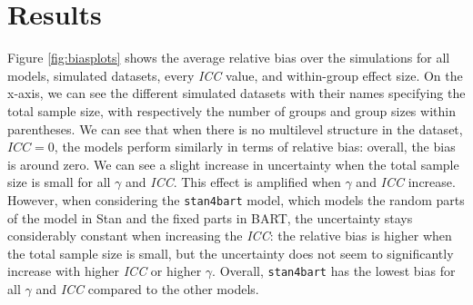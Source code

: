 \documentclass[10pt, a4paper, titlepage]{article}
\begin{document}
\section{Results}
\graphicspath{{./graphs/}}
Figure \ref{fig:biasplots} shows the average relative bias over the simulations for all models, simulated datasets, every \textit{ICC} value, and within-group effect size. On the x-axis, we can see the different simulated datasets with their names specifying the total sample size, with respectively the number of groups and group sizes within parentheses. We can see that when there is no multilevel structure in the dataset, $ICC = 0$, the models perform similarly in terms of relative bias: overall, the bias is around zero. We can see a slight increase in uncertainty when the total sample size is small for all $\gamma$ and \textit{ICC}. This effect is amplified when $\gamma$ and \textit{ICC} increase. However, when considering the \texttt{stan4bart} model, which models the random parts of the model in Stan and the fixed parts in BART, the uncertainty stays considerably constant when increasing the \textit{ICC}: the relative bias is higher when the total sample size is small, but the uncertainty does not seem to significantly increase with higher \textit{ICC} or higher $\gamma$. Overall, \texttt{stan4bart} has the lowest bias for all $\gamma$ and \textit{ICC} compared to the other models.
\end{document}
